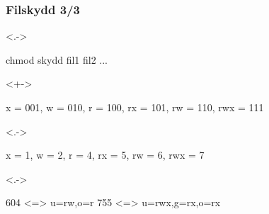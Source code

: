 \begin{frame}[fragile,t]
    \frametitle{Filskydd 3/3}

    \begin{onlyenv}<.->
        \begin{GobbleCode}{8}
            chmod skydd fil1 fil2 ...
        \end{GobbleCode}
    \end{onlyenv}

    
    \halfblankline 

    \begin{onlyenv}<+->
        \begin{GobbleCode}{8}
            x = 001, w = 010, r = 100, rx = 101, rw = 110, rwx = 111
        \end{GobbleCode}
    \end{onlyenv}
    
    
    
    \begin{onlyenv}<.->
        \begin{GobbleCode}{8}
            x = 1, w = 2, r = 4, rx = 5, rw = 6, rwx = 7
        \end{GobbleCode}
    \end{onlyenv}
    
    
    
    \begin{onlyenv}<.->
        \begin{GobbleCode}{8}
            604 <=> u=rw,o=r    755 <=> u=rwx,g=rx,o=rx
        \end{GobbleCode}
    \end{onlyenv}
\end{frame}

